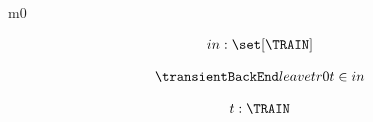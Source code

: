 \documentclass[12pt]{amsart}
\title{}
\author{}
\date{} %
\begin{document}
\maketitle
\tableofcontents


\begin{machine}{m0}


%
	\begin{align*}
\variable{		in : \set[\TRAIN]}
	\end{align*}
%



\begin{align*}
\transient{leave}{tr0}
{t \in in}
\end{align*}

\begin{align*}
\dummy{	t : \TRAIN}
\end{align*}


\end{machine}
\end{document}
